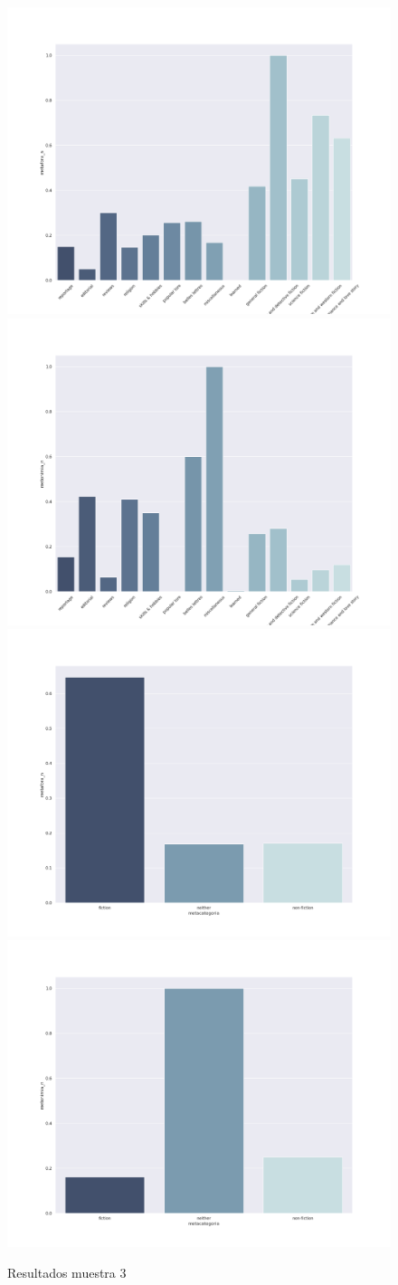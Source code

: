 \documentclass[12pt,letterpaper,twoside]{article}
\begin{document}
\begin{figure}[H]
\centering
\includegraphics[width=.45\linewidth]{./resultados/graphs/muestra/c3_metafora.png}
\includegraphics[width=.45\linewidth]{./resultados/graphs/muestra/c3_metonimia.png}
\includegraphics[width=.45\linewidth]{./resultados/graphs/meta/c3_metacategoria_metafora.png}
\includegraphics[width=.45\linewidth]{./resultados/graphs/meta/c3_metacategoria_metonimia.png}
\caption{\label{fig:c3_resultados}Resultados muestra 3}
\end{figure}
\end{document}

